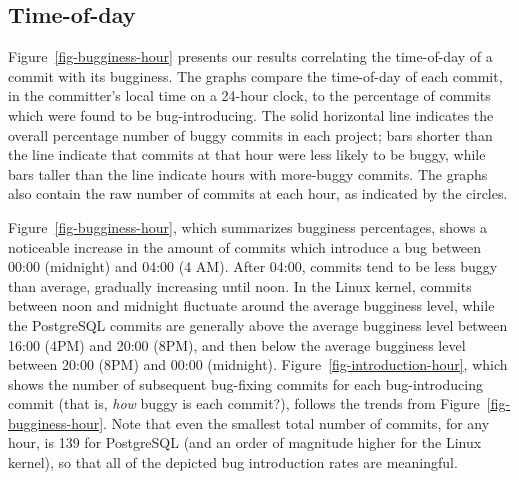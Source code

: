 \subsection{Time-of-day} 
\label{sec-time-of-day}

Figure~\ref{fig-bugginess-hour} presents our results correlating the time-of-day
of a commit with its bugginess.  The graphs compare the time-of-day of each
commit, in the committer's local time on a 24-hour clock, to the percentage of
commits which were found to be bug-introducing. The solid horizontal line
indicates the overall percentage number of buggy commits in each project; bars
shorter than the line indicate that commits at that hour were less likely to be
buggy, while bars taller than the line indicate hours with more-buggy
commits. The graphs also contain the raw number of commits at each hour, as
indicated by the circles.


Figure~\ref{fig-bugginess-hour}, which summarizes bugginess percentages, shows a
noticeable increase in the amount of commits which introduce a bug between 00:00
(midnight) and 04:00 (4 AM). After 04:00, commits tend to be less buggy than
average, gradually increasing until noon.  In the Linux kernel, commits between
noon and midnight fluctuate around the average bugginess level, while the
PostgreSQL commits are generally above the average bugginess level between 16:00
(4PM) and 20:00 (8PM), and then below the average bugginess level between 20:00
(8PM) and 00:00 (midnight). Figure~\ref{fig-introduction-hour}, which shows the
number of subsequent bug-fixing commits for each bug-introducing commit (that
is, {\em how} buggy is each commit?), follows the trends from
Figure~\ref{fig-bugginess-hour}. Note that even the smallest total number of
commits, for any hour, is 139 for PostgreSQL (and an order of magnitude higher
for the Linux kernel), so that all of the depicted bug introduction rates are
meaningful.

